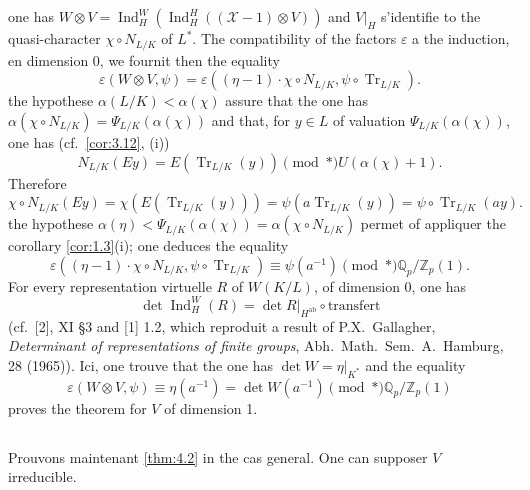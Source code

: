 \documentclass[12pt,a4paper]{article}
\theoremstyle{plain}
\theoremstyle{definition}
\theoremstyle{remark}
\DeclareMathOperator{\Ind}{Ind}
\DeclareMathOperator{\Tr}{Tr}
\newcommand{\cX}{\mathcal{X}}
\newcommand{\bQ}{\mathbb{Q}}
\newcommand{\bZ}{\mathbb{Z}}
\providecommand{\cX}{\mathcal{X}}
\providecommand{\Tr}{\operatorname{Tr}}
\begin{document}
\subsection{}
\label{sec:4.4}

one has $W \otimes V = \Ind_H^W(\Ind_H^H((\cX-1) \otimes V))$ and $V|_H$ s'identifie to the quasi-character $\chi \circ N_{L/K}$ of $L^*$. The compatibility of the factors $\varepsilon$ a the induction, en dimension 0, we fournit then the equality
\[
\varepsilon(W \otimes V, \psi) = \varepsilon((\eta-1) \cdot \chi \circ N_{L/K}, \psi \circ \Tr_{L/K}).
\]
the hypothese $\alpha(L/K) < \alpha(\chi)$ assure that the one has $\alpha(\chi \circ N_{L/K}) = \Psi_{L/K}(\alpha(\chi))$ and that, for $y \in L$ of valuation $\Psi_{L/K}(\alpha(\chi))$, one has (cf.~\ref{cor:3.12}, (i))
\[
N_{L/K}(Ey) = E(\Tr_{L/K}(y)) \pmod{*} U(\alpha(\chi)+1).
\]
Therefore
\[
\chi \circ N_{L/K}(Ey) = \chi(E(\Tr_{L/K}(y))) = \psi(a \Tr_{L/K}(y)) = \psi \circ \Tr_{L/K}(ay).
\]
the hypothese $\alpha(\eta) < \Psi_{L/K}(\alpha(\chi)) = \alpha(\chi \circ N_{L/K})$ permet of appliquer the corollary \ref{cor:1.3}(i); one deduces the equality
\[
\varepsilon((\eta-1) \cdot \chi \circ N_{L/K}, \psi \circ \Tr_{L/K}) \equiv \psi(a^{-1}) \pmod{*} \bQ_p/\bZ_p(1).
\]
For every representation virtuelle $R$ of $W(K/L)$, of dimension 0, one has
\[
\det \Ind_H^W(R) = \det R|_{H^{\text{ab}}} \circ \text{transfert}
\]
(cf.~[2], XI \S 3 and [1] 1.2, which reproduit a result of P.X.~Gallagher, \textit{Determinant of representations of finite groups}, Abh.~Math.~Sem.~A.~Hamburg, 28 (1965)). Ici, one trouve that the one has $\det W = \eta|_{K^*}$ and the equality
\[
\varepsilon(W \otimes V, \psi) \equiv \eta(a^{-1}) = \det W(a^{-1}) \pmod{*} \bQ_p/\bZ_p(1)
\]
proves the theorem for $V$ of dimension 1.

\subsection{}
\label{sec:4.5}

Prouvons maintenant \ref{thm:4.2} in the cas general. One can supposer $V$ irreducible.
\end{document}

